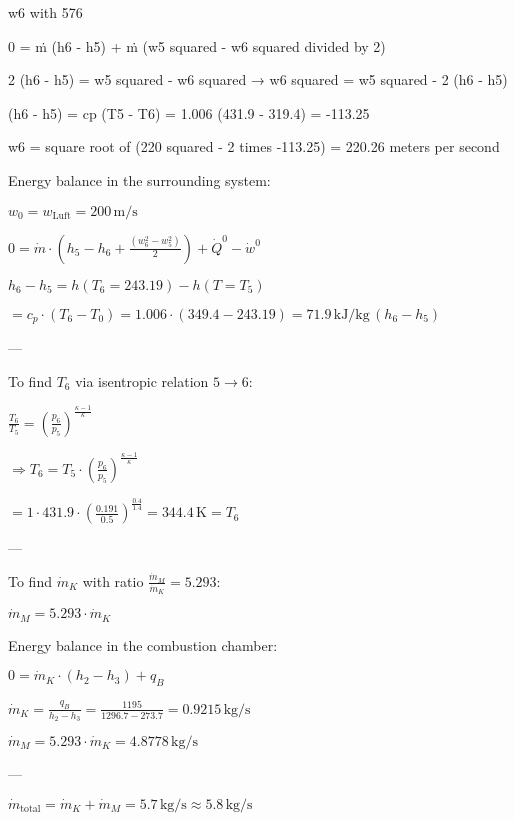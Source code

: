 w6 with 576  

0 = ṁ (h6 - h5) + ṁ (w5 squared - w6 squared divided by 2)  

2 (h6 - h5) = w5 squared - w6 squared  
→ w6 squared = w5 squared - 2 (h6 - h5)  

(h6 - h5) = cp (T5 - T6) = 1.006 (431.9 - 319.4) = -113.25  

w6 = square root of (220 squared - 2 times -113.25) = 220.26 meters per second

Energy balance in the surrounding system:  

\( w_0 = w_{\text{Luft}} = 200 \, \text{m/s} \)  

\( 0 = \dot{m} \cdot (h_5 - h_6 + \frac{(w_6^2 - w_5^2)}{2}) + \dot{Q}^0 - \dot{w}^0 \)  

\( h_6 - h_5 = h(T_6 = 243.19) - h(T = T_5) \)  

\( = c_p \cdot (T_6 - T_0) = 1.006 \cdot (349.4 - 243.19) = 71.9 \, \text{kJ/kg} \, (h_6 - h_5) \)  

---

To find \( T_6 \) via isentropic relation \( 5 \rightarrow 6 \):  

\( \frac{T_6}{T_5} = \left(\frac{p_6}{p_5}\right)^{\frac{\kappa - 1}{\kappa}} \)  

\( \Rightarrow T_6 = T_5 \cdot \left(\frac{p_6}{p_5}\right)^{\frac{\kappa - 1}{\kappa}} \)  

\( = 1 \cdot 431.9 \cdot \left(\frac{0.191}{0.5}\right)^{\frac{0.4}{1.4}} = 344.4 \, \text{K} = T_6 \)  

---

To find \( \dot{m}_K \) with ratio \( \frac{\dot{m}_M}{\dot{m}_K} = 5.293 \):  

\( \dot{m}_M = 5.293 \cdot \dot{m}_K \)  

Energy balance in the combustion chamber:  

\( 0 = \dot{m}_K \cdot (h_2 - h_3) + q_B \)  

\( \dot{m}_K = \frac{q_B}{h_2 - h_3} = \frac{1195}{1296.7 - 273.7} = 0.9215 \, \text{kg/s} \)  

\( \dot{m}_M = 5.293 \cdot \dot{m}_K = 4.8778 \, \text{kg/s} \)  

---

\( \dot{m}_{\text{total}} = \dot{m}_K + \dot{m}_M = 5.7 \, \text{kg/s} \approx 5.8 \, \text{kg/s} \)